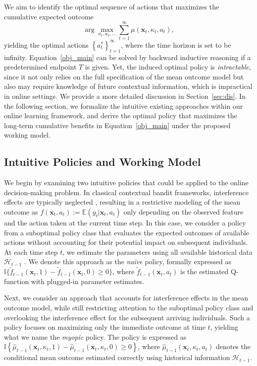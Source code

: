 \documentclass[12pt]{article}
\begin{document}
We aim to identify the optimal sequence of actions that maximizes the cumulative expected outcome
\begin{equation}
\label{obj_main}
\arg\max_{a_1,a_2,\dots} \sum_{t=1}^\infty \mu(\bm{x}_t, \kappa_t, a_t),
\end{equation}
yielding the optimal actions $\left\{a_t^\ast\right\}_{t=1}^\infty$, where the time horizon is set to be infinity. 
Equation~\eqref{obj_main} can be solved by backward inductive reasoning \citep[see e.g.,][]{chakraborty2014} if a predetermined endpoint $T$ is given. Yet, the induced optimal policy is \textit{intractable}, since it not only relies on the full specification of the mean outcome model but also may require knowledge of future contextual information, which is impractical in online settings. We provide a more detailed discussion in Section~\ref{sec:dis}. In the following section, we formalize the intuitive existing approaches within our online learning framework, and derive the optimal policy that maximizes the long-term cumulative benefits in Equation~\eqref{obj_main} under the proposed working model.

\subsection{Intuitive Policies and Working Model}
\label{subsec:naive}

We begin by examining two intuitive policies that could be applied to the online decision-making problem. In classical contextual bandit frameworks, interference effects are typically neglected \citep{chen2021,shen2024}, resulting in a restrictive modeling of the mean outcome as $f(\bm{x}_t, a_t) := \mathbb{E}(y_t |\bm{x}_t, a_t)$ only depending on the observed feature and the action taken at the current time step. In this case, we consider a policy from a suboptimal policy class that evaluates the expected outcomes of available actions without accounting for their potential impact on subsequent individuals. At each time step $t$, we estimate the parameters using all available historical data $\mathcal{H}_{t-1}$ \citep{deshpande2018,zhang2020,chen2021}.
We denote this approach as the \emph{na\"ive} policy, formally expressed as $\mathbb{I}\{\tilde{f}_{t-1}(\bm{x}_t, 1)-\tilde{f}_{t-1}(\bm{x}_t, 0)\ge 0 \}$, where $\tilde{f}_{t-1}(\bm{x}_t, a_t)$ is the estimated Q-function with plugged-in parameter estimates. 

Next, we consider an approach that accounts for interference effects in the mean outcome model, while still restricting attention to the suboptimal policy class and overlooking the interference effect for the subsequent arriving individuals. Such a policy focuses on maximizing only the immediate outcome at time $t$, yielding what we name the \emph{myopic} policy. The policy is expressed as $\mathbb{I}\left\{\widehat{\mu}_{t-1}(\bm{x}_t, \kappa_t,1) - \widehat{\mu}_{t-1}(\bm{x}_t, \kappa_t,0) \ge 0\right\}$, where $\widehat{\mu}_{t-1}(\bm{x}_t, \kappa_t,a_t)$ denotes the conditional mean outcome estimated correctly using historical information $\mathcal{H}_{t-1}$.
\end{document}
